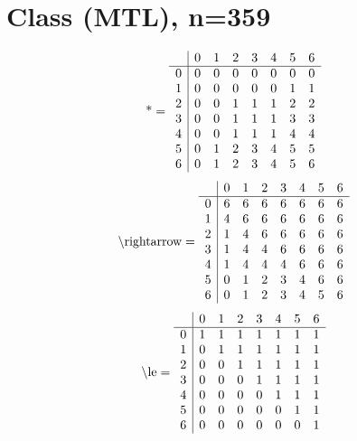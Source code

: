 \documentclass[11pt]{article}
\begin{document}
\section{Class (MTL), n=359}
\[\text{*} = 
\begin{array}{r | r r r r r r r}
 & 0 & 1 & 2 & 3 & 4 & 5 & 6 \\ \hline
0 & 0 & 0 & 0 & 0 & 0 & 0 & 0 \\
1 & 0 & 0 & 0 & 0 & 0 & 1 & 1 \\
2 & 0 & 0 & 1 & 1 & 1 & 2 & 2 \\
3 & 0 & 0 & 1 & 1 & 1 & 3 & 3 \\
4 & 0 & 0 & 1 & 1 & 1 & 4 & 4 \\
5 & 0 & 1 & 2 & 3 & 4 & 5 & 5 \\
6 & 0 & 1 & 2 & 3 & 4 & 5 & 6 \\
\end{array}
\]
\[\text{\textbackslash rightarrow} = 
\begin{array}{r | r r r r r r r}
 & 0 & 1 & 2 & 3 & 4 & 5 & 6 \\ \hline
0 & 6 & 6 & 6 & 6 & 6 & 6 & 6 \\
1 & 4 & 6 & 6 & 6 & 6 & 6 & 6 \\
2 & 1 & 4 & 6 & 6 & 6 & 6 & 6 \\
3 & 1 & 4 & 4 & 6 & 6 & 6 & 6 \\
4 & 1 & 4 & 4 & 4 & 6 & 6 & 6 \\
5 & 0 & 1 & 2 & 3 & 4 & 6 & 6 \\
6 & 0 & 1 & 2 & 3 & 4 & 5 & 6 \\
\end{array}
\]
\[\text{\textbackslash le} = 
\begin{array}{r | r r r r r r r}
 & 0 & 1 & 2 & 3 & 4 & 5 & 6 \\ \hline
0 & 1 & 1 & 1 & 1 & 1 & 1 & 1 \\
1 & 0 & 1 & 1 & 1 & 1 & 1 & 1 \\
2 & 0 & 0 & 1 & 1 & 1 & 1 & 1 \\
3 & 0 & 0 & 0 & 1 & 1 & 1 & 1 \\
4 & 0 & 0 & 0 & 0 & 1 & 1 & 1 \\
5 & 0 & 0 & 0 & 0 & 0 & 1 & 1 \\
6 & 0 & 0 & 0 & 0 & 0 & 0 & 1 \\
\end{array}
\]
\end{document}
